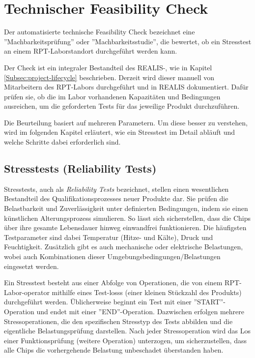 \section{Technischer Feasibility Check}
Der automatisierte technische Feasibility Check bezeichnet eine ''Machbarkeitsprüfung'' oder ''Machbarkeitsstudie'', die bewertet, ob ein Stresstest an einem \gls{RPT}-Laborstandort durchgeführt werden kann.

Der Check ist ein integraler Bestandteil des \gls{REALIS}-, wie in Kapitel \ref{Subsec:project-lifecycle} beschrieben. Derzeit wird dieser manuell von Mitarbeitern des \gls{RPT}-Labors durchgeführt und in \gls{REALIS} dokumentiert. Dafür prüfen sie, ob die im Labor vorhandenen Kapazitäten und Bedingungen ausreichen, um die geforderten Tests für das jeweilige Produkt durchzuführen.

Die Beurteilung basiert auf mehreren Parametern. Um diese besser zu verstehen, wird im folgenden Kapitel erläutert, wie ein Stresstest im Detail abläuft und welche Schritte dabei erforderlich sind.


\subsection{Stresstests (Reliability Tests)}

Stresstests, auch als \textit{Reliability Tests} bezeichnet, stellen einen wesentlichen Bestandteil des Qualifikationsprozesses neuer Produkte dar. Sie prüfen die Belastbarkeit und Zuverlässigkeit unter definierten Bedingungen, indem sie einen künstlichen Alterungsprozess simulieren. So lässt sich sicherstellen, dass die Chips über ihre gesamte Lebensdauer hinweg einwandfrei funktionieren. Die häufigsten Testparameter sind dabei Temperatur (Hitze- und Kälte), Druck und Feuchtigkeit. Zusätzlich gibt es auch mechanische oder elektrische Belastungen, wobei auch Kombinationen dieser Umgebungsbedingungen/Belastungen eingesetzt werden.

Ein Stresstest besteht aus einer Abfolge von Operationen, die von einem \gls{RPT}-Labor-\gls{operator} mithilfe eines Test-\glspl{los}s (einer kleinen Stückzahl des Produkts) durchgeführt werden. Üblicherweise beginnt ein Test mit einer ''START''-Operation und endet mit einer ''END''-Operation. Dazwischen erfolgen mehrere Stressoperationen, die den spezifischen Stresstyp des Tests abbilden und die eigentliche Belastungsprüfung darstellen. Nach jeder Stressoperation wird das Los einer Funktionsprüfung (weitere Operation) unterzogen, um sicherzustellen, dass alle Chips die vorhergehende Belastung unbeschadet überstanden haben.

